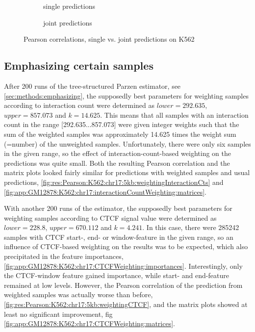 \begin{figure}
\centering
\begin{subfigure}{.495\textwidth}
  \centering
 \caption{single predictions}
 \label{fig:res:Pearson:allSingle:K562:chr17:5kb}
\end{subfigure}\hfill%
\begin{subfigure}{.495\textwidth}
  \centering
 \caption{joint predictions}
 \label{fig:res:Pearson:allTogether:K562:chr17:5kb}
\end{subfigure}
\caption{Pearson correlations, single vs. joint predictions on K562}
\label{fig:res:Pearson:singleVsTogether:K562:chr17:5k}
\end{figure}



\subsection{Emphasizing certain samples} \label{sec:res:emphasizing}
After 200 runs of the tree-structured Parzen estimator, see \autoref{sec:methods:emphasizing},
the supposedly best parameters for weighting samples according to interaction count were determined as 
$lower=292.635$, $upper=857.073$ and $k=14.625$. 
This means that all samples with an interaction count in the range [292.635...857.073] were given integer weights such that 
the sum of the weighted samples was approximately 14.625 times the weight sum (=number) of the unweighted samples.
Unfortunately, there were only six samples in the given range, 
so the effect of interaction-count-based weighting on the predictions was quite small.
Both the resulting Pearson correlation and the matrix plots looked fairly similar for predictions with weighted samples
and usual predictions, \autoref{fig:res:Pearson:K562:chr17:5kb:weightingInteractionCts} 
and \ref{fig:app:GM12878:K562:chr17:interactionCountWeighting:matrices}.

With another 200 runs of the estimator, the supposedly best parameters for weighting samples according to CTCF signal value
were determined as $lower=228.8$, $upper=670.112$ and $k=4.241$. 
In this case, there were \num{285242} samples with CTCF start-, end- or window-feature in the given range, 
so an influence of CTCF-based weighting on the results was to be expected, which also precipitated in the feature importances,
\autoref{fig:app:GM12878:K562:chr17:CTCFWeighting:importances}. 
Interestingly, only the CTCF-window feature gained importance, while start- and end-feature 
remained at low levels.
However, the Pearson correlation of the prediction from weighted samples was actually worse than before, 
\autoref{fig:res:Pearson:K562:chr17:5kb:weightingCTCF},
and the matrix plots showed at least no significant improvement, fig\,\ref{fig:app:GM12878:K562:chr17:CTCFWeighting:matrices}.

